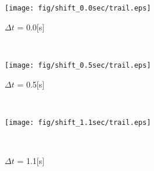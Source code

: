 \documentclass{sigchi}
\begin{document}

\begin{figure}
\centering
  \texttt{[image: fig/shift\_0.0sec/trail.eps]}
  \caption{$\Delta t$ = 0.0[s]}~\label{fig:0.0sec}%



  \texttt{[image: fig/shift\_0.5sec/trail.eps]}
  \caption{$\Delta t$ = 0.5[s]}~\label{fig:0.5sec}




  \texttt{[image: fig/shift\_1.1sec/trail.eps]}
  \caption{$\Delta t$ = 1.1[s]}~\label{fig:1.1sec}
\end{figure}



%
%
%
%
%
\balance{}
\end{document}
